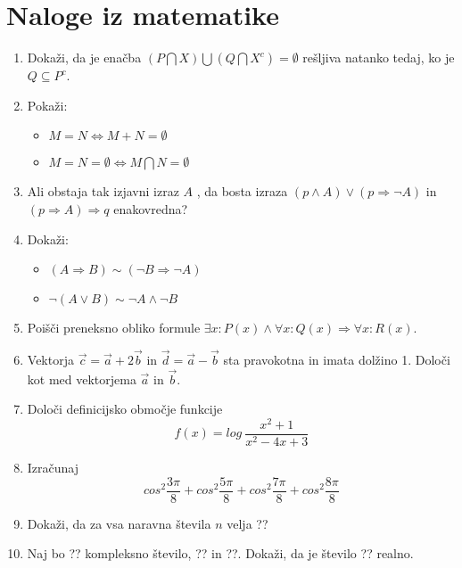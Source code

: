 \documentclass[a4paper,12pt]{article}
\begin{document}
\section{Naloge iz matematike}

\begin{enumerate}

\item Dokaži, da je enačba $ (P \bigcap X) \bigcup (Q \bigcap X^c
) = \emptyset $
rešljiva natanko tedaj, ko je $ Q \subseteq P^c $.


\item Pokaži:

\begin{itemize}
\item $M = N \iff M + N = \emptyset$
\item $M = N = \emptyset \iff M \bigcap N = \emptyset$
\end{itemize}

\item Ali obstaja tak izjavni izraz $A$ , da bosta izraza $(p \wedge A) \vee (p \Rightarrow \neg A)$ in $(p \Rightarrow A) \Rightarrow q$
enakovredna?


\item Dokaži:
\begin{itemize}
\item $(A \Rightarrow B) \sim (\neg B \Rightarrow \neg A)$
\item $\neg(A \vee B) \sim \neg A \wedge \neg B$
\end{itemize}

\item Poišči preneksno obliko formule $\exists x : P(x) \wedge \forall x : Q(x) \Rightarrow \forall x : R(x)$.

\item Vektorja $ \vec{c} = \vec{a} + 2 \vec{b} $ in $ \vec{d} = \vec{a} - \vec{b} $
sta pravokotna in imata dolžino 1. Določi kot med vektorjema $\vec{a}$ in $\vec{b}$.

\item Določi definicijsko območje funkcije
$$f(x) = log ~ \frac{x^2+1}{x^2-4x+3}$$

\item Izračunaj
$$cos^2 \frac{3 \pi}{8} + cos^2 \frac{5 \pi}{8} + cos^2 \frac{7 \pi}{8} + cos^2 \frac{8 \pi}{8}$$

\item Dokaži, da za vsa naravna števila $n$ velja
??

\item Naj bo ?? kompleksno število, ?? in ??.
Dokaži, da je število ?? realno.


\end{enumerate}
\end{document}
